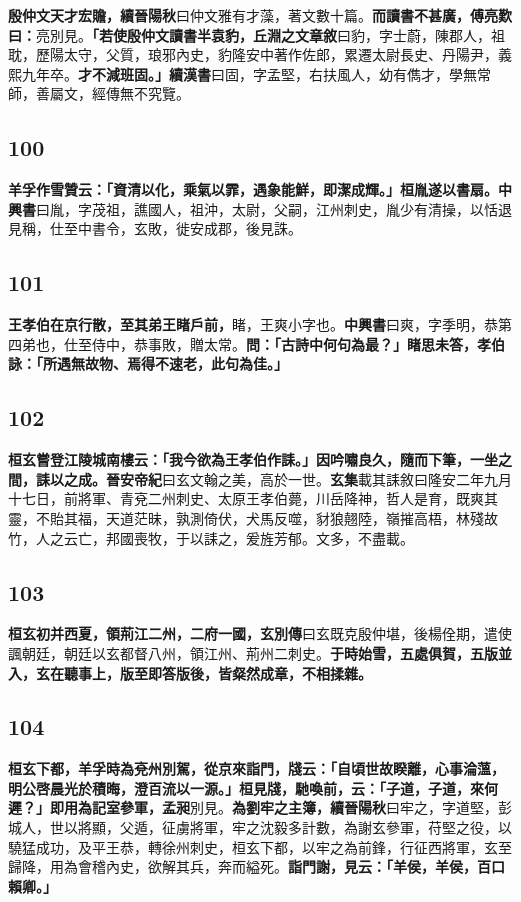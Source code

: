 \textbf{殷仲文天才宏贍，}{\footnotesize \textbf{續晉陽秋}曰仲文雅有才藻，著文數十篇。}\textbf{而讀書不甚廣，傅亮歎曰：}{\footnotesize 亮別見。}\textbf{「若使殷仲文讀書半袁豹，}{\footnotesize \textbf{丘淵之文章敘}曰豹，字士蔚，陳郡人，祖耽，歷陽太守，父質，琅邪內史，豹隆安中著作佐郎，累遷太尉長史、丹陽尹，義熙九年卒。}\textbf{才不減班固。」}{\footnotesize \textbf{續漢書}曰固，字孟堅，右扶風人，幼有儁才，學無常師，善屬文，經傳無不究覽。}

\subsection*{100}

\textbf{羊孚作雪贊云：「資清以化，乘氣以霏，遇象能鮮，即潔成輝。」桓胤遂以書扇。}{\footnotesize \textbf{中興書}曰胤，字茂祖，譙國人，祖沖，太尉，父嗣，江州刺史，胤少有清操，以恬退見稱，仕至中書令，玄敗，徙安成郡，後見誅。}

\subsection*{101}

\textbf{王孝伯在京行散，至其弟王睹戶前，}{\footnotesize 睹，王爽小字也。\textbf{中興書}曰爽，字季明，恭第四弟也，仕至侍中，恭事敗，贈太常。}\textbf{問：「古詩中何句為最？」睹思未答，孝伯詠：「所遇無故物、焉得不速老，此句為佳。」}

\subsection*{102}

\textbf{桓玄嘗登江陵城南樓云：「我今欲為王孝伯作誄。」因吟嘯良久，隨而下筆，一坐之間，誄以之成。}{\footnotesize \textbf{晉安帝紀}曰玄文翰之美，高於一世。\textbf{玄集}載其誄敘曰隆安二年九月十七日，前將軍、青兗二州刺史、太原王孝伯薨，川岳降神，哲人是育，既爽其靈，不貽其福，天道茫昧，孰測倚伏，犬馬反噬，豺狼翹陸，嶺摧高梧，林殘故竹，人之云亡，邦國喪牧，于以誄之，爰旌芳郁。文多，不盡載。}

\subsection*{103}

\textbf{桓玄初并西夏，領荊江二州，二府一國，}{\footnotesize \textbf{玄別傳}曰玄既克殷仲堪，後楊佺期，遣使諷朝廷，朝廷以玄都督八州，領江州、荊州二刺史。}\textbf{于時始雪，五處俱賀，五版並入，玄在聽事上，版至即答版後，皆粲然成章，不相揉雜。}

\subsection*{104}

\textbf{桓玄下都，羊孚時為兗州別駕，從京來詣門，牋云：「自頃世故睽離，心事淪薀，明公啓晨光於積晦，澄百流以一源。」桓見牋，馳喚前，云：「子道，子道，來何遲？」即用為記室參軍，孟昶}{\footnotesize 別見。}\textbf{為劉牢之主簿，}{\footnotesize \textbf{續晉陽秋}曰牢之，字道堅，彭城人，世以將顯，父遁，征虜將軍，牢之沈毅多計數，為謝玄參軍，苻堅之役，以驍猛成功，及平王恭，轉徐州刺史，桓玄下都，以牢之為前鋒，行征西將軍，玄至歸降，用為會稽內史，欲解其兵，奔而縊死。}\textbf{詣門謝，見云：「羊侯，羊侯，百口賴卿。」}